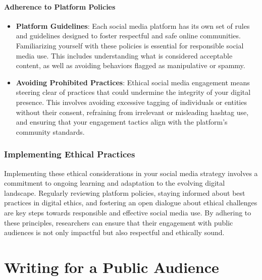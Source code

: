 \documentclass[
]{book}
\begin{document}
\hypertarget{adherence-to-platform-policies}{%
\subsubsection{Adherence to Platform Policies}\label{adherence-to-platform-policies}}

\begin{itemize}
\item
  \textbf{Platform Guidelines}: Each social media platform has its own set of rules and guidelines designed to foster respectful and safe online communities. Familiarizing yourself with these policies is essential for responsible social media use. This includes understanding what is considered acceptable content, as well as avoiding behaviors flagged as manipulative or spammy.
\item
  \textbf{Avoiding Prohibited Practices}: Ethical social media engagement means steering clear of practices that could undermine the integrity of your digital presence. This involves avoiding excessive tagging of individuals or entities without their consent, refraining from irrelevant or misleading hashtag use, and ensuring that your engagement tactics align with the platform's community standards.
\end{itemize}

\hypertarget{implementing-ethical-practices}{%
\subsection{Implementing Ethical Practices}\label{implementing-ethical-practices}}

Implementing these ethical considerations in your social media strategy involves a commitment to ongoing learning and adaptation to the evolving digital landscape. Regularly reviewing platform policies, staying informed about best practices in digital ethics, and fostering an open dialogue about ethical challenges are key steps towards responsible and effective social media use. By adhering to these principles, researchers can ensure that their engagement with public audiences is not only impactful but also respectful and ethically sound.

\hypertarget{writing-for-a-public-audience}{%
\chapter{Writing for a Public Audience}\label{writing-for-a-public-audience}}
\end{document}
